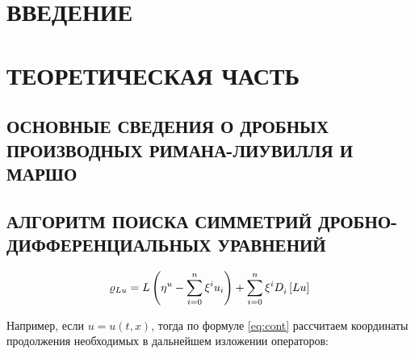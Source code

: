 \documentclass[a4paper, fontsize=14pt]{article}
\newcommand{\MD}[2]{\mathbb{D}_{#1}^{\alpha}[#2]} %
\newcommand{\RLD}[3]{{}_{#1}\mathcal{D}_{#2}^{\alpha} \left[#3\right]} %
\newcommand{\D}[3]{D_{#1}^{#2} \left[ #3 \right]} %
\begin{document}
\tableofcontents

\newpage
\section*{ВВЕДЕНИЕ}


\section[Теоретическая часть]{ТЕОРЕТИЧЕСКАЯ ЧАСТЬ}

\subsection[Основные сведения о дробных производных Римана-Лиувилля и Маршо]{ОСНОВНЫЕ СВЕДЕНИЯ О ДРОБНЫХ ПРОИЗВОДНЫХ РИМАНА-ЛИУВИЛЛЯ И МАРШО}

\subsection[Алгоритм поиска симметрий дробно-дифференциальных уравнений]{АЛГОРИТМ ПОИСКА СИММЕТРИЙ ДРОБНО-ДИФФЕРЕНЦИАЛЬНЫХ УРАВНЕНИЙ}







\begin{equation}
  \label{eq:cont}
  \begin{split}
    {\huge \varrho}_{Lu} = L\left(\eta^u - \sum_{i=0}^{n} \xi^i u_i \right) + \sum_{i=0}^{n} \xi^i \D{i}{}{L u}
  \end{split}
\end{equation}

Например, если $u = u(t, x)$, тогда по формуле \eqref{eq:cont} рассчитаем координаты продолжения необходимых в дальнейшем изложении операторов:
\end{document}
